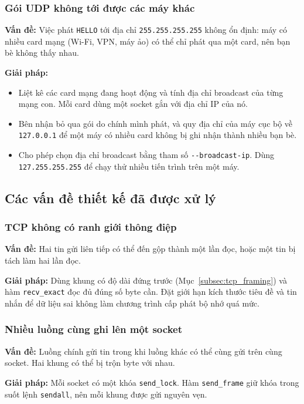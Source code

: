 \documentclass[a4paper,12pt]{article}
\newcommand{\code}[1]{\texttt{#1}}
\begin{document}
	\subsubsection{Gói UDP không tới được các máy khác}
	\textbf{Vấn đề:} Việc phát \code{HELLO} tới địa chỉ \code{255.255.255.255} không ổn định: máy có nhiều card mạng (Wi-Fi, VPN, máy ảo) có thể chỉ phát qua một card, nên bạn bè không thấy nhau.
	
	\textbf{Giải pháp:}
	\begin{itemize}
		\item Liệt kê các card mạng đang hoạt động và tính địa chỉ broadcast của từng mạng con. Mỗi card dùng một socket gắn với địa chỉ IP của nó.
		\item Bên nhận bỏ qua gói do chính mình phát, và quy địa chỉ của máy cục bộ về \code{127.0.0.1} để một máy có nhiều card không bị ghi nhận thành nhiều bạn bè.
		\item Cho phép chọn địa chỉ broadcast bằng tham số \code{-\/-broadcast-ip}. Dùng \code{127.255.255.255} để chạy thử nhiều tiến trình trên một máy.
	\end{itemize}
	
	\subsection{Các vấn đề thiết kế đã được xử lý}
	
	\subsubsection{TCP không có ranh giới thông điệp}
	\textbf{Vấn đề:} Hai tin gửi liên tiếp có thể đến gộp thành một lần đọc, hoặc một tin bị tách làm hai lần đọc.
	
	\textbf{Giải pháp:} Dùng khung có độ dài đứng trước (Mục~\ref{subsec:tcp_framing}) và hàm \code{recv\_exact} đọc đủ đúng số byte cần. Đặt giới hạn kích thước tiêu đề và tin nhắn để dữ liệu sai không làm chương trình cấp phát bộ nhớ quá mức.
	
	\subsubsection{Nhiều luồng cùng ghi lên một socket}
	\textbf{Vấn đề:} Luồng chính gửi tin trong khi luồng khác có thể cùng gửi trên cùng socket. Hai khung có thể bị trộn byte với nhau.
	
	\textbf{Giải pháp:} Mỗi socket có một khóa \code{send\_lock}. Hàm \code{send\_frame} giữ khóa trong suốt lệnh \code{sendall}, nên mỗi khung được gửi nguyên vẹn.
	
\end{document}
